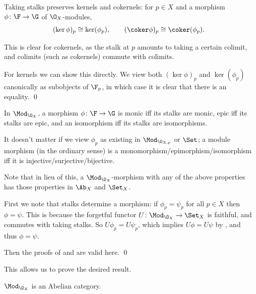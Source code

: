     Taking stalks preserves kernels and cokernels: for $p\in X$ and a morphism $\phi\colon\F\to\G$ of $\O_X$-modules,
    $$ (\ker\phi)_p \cong \ker(\phi_p),\qquad (\coker\phi)_p \cong \coker(\phi_p) . $$

\elemm

\bproof

    This is clear for cokernels, as the stalk at $p$ amounts to taking a certain colimit, and colimits (such as cokernels)
    commute with colimits.

    For kernels we can show this directly.
    We view both $(\ker\phi)_p$ and $\ker(\phi_p)$ canonically as subobjects of $\F_p$, in which case it is clear that
    there is an equality.
    \qed

\eproof

\blemm[name={monepionstalks}]

    In $\Mod_{\O_X}$, a morphism $\phi\colon\F\to\G$ is monic iff its stalks are monic, epic iff its stalks are epic,
    and an isomorphism iff its stalks are isomorphisms.

\elemm

\bnote

    It doesn't matter if we view $\phi_p$ as existing in $\Mod_{\O_{X,p}}$ or $\Set$; a module morphism (in the ordinary
    sense) is a monomorphism/epimorphism/isomorphism iff it is injective/surjective/bijective.

    Note that in lieu of this, a $\Mod_{\O_X}$-morphism with any of the above properties has those properties in
    $\Ab_X$ and $\Set_X$.

\enote

\bproof

    First we note that stalks determine a morphism: if $\phi_p=\psi_p$ for all $p\in X$ then $\phi=\psi$.
    This is because the forgetful functor $U\colon\Mod_{\O_X}\to\Set_X$ is faithful, and commutes with taking stalks.
    So $U\phi_p=U\psi_p$, which implies $U\phi=U\psi$ by , and thus $\phi=\psi$.

    Then the proofs of  and  are valid here.
    \qed

\eproof

This allows us to prove the desired result.

\bthrm

    $\Mod_{\O_X}$ is an Abelian category. 

\ethrm


